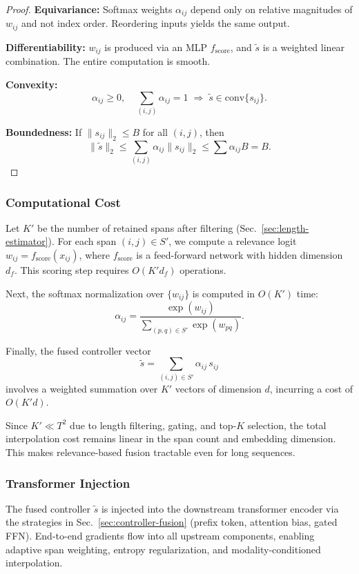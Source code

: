 \begin{proof}
	\textbf{Equivariance:} Softmax weights \(\alpha_{ij}\) depend only on relative magnitudes of \(w_{ij}\) and not index order. Reordering inputs yields the same output.
	
	\textbf{Differentiability:} \(w_{ij}\) is produced via an MLP \(f_{\mathrm{score}}\), and \(\tilde{s}\) is a weighted linear combination. The entire computation is smooth.
	
	\textbf{Convexity:}
	\[
	\alpha_{ij} \ge 0,\quad \sum_{(i,j)} \alpha_{ij} = 1
	\;\Rightarrow\;
	\tilde{s} \in \mathrm{conv}\{s_{ij}\}.
	\]
	
	\textbf{Boundedness:} If \(\|s_{ij}\|_2 \le B\) for all \((i,j)\), then
	\[
	\|\tilde{s}\|_2
	\le \sum_{(i,j)} \alpha_{ij} \|s_{ij}\|_2
	\le \sum \alpha_{ij} B = B.
	\]
\end{proof}

\subsubsection{Computational Cost}

Let \(K'\) be the number of retained spans after filtering (Sec.~\ref{sec:length-estimator}). For each span \((i,j)\in S'\), we compute a relevance logit \(w_{ij} = f_{\mathrm{score}}(x_{ij})\), where \(f_{\mathrm{score}}\) is a feed-forward network with hidden dimension \(d_f\). This scoring step requires \(O(K' d_f)\) operations.

Next, the softmax normalization over \(\{w_{ij}\}\) is computed in \(O(K')\) time:
\[
\alpha_{ij} = \frac{\exp(w_{ij})}{\sum_{(p,q)\in S'}\exp(w_{pq})}.
\]

Finally, the fused controller vector
\[
\tilde{s} = \sum_{(i,j)\in S'} \alpha_{ij}\,s_{ij}
\]
involves a weighted summation over \(K'\) vectors of dimension \(d\), incurring a cost of \(O(K'd)\).

Since \(K'\ll T^2\) due to length filtering, gating, and top-\(K\) selection, the total interpolation cost remains linear in the span count and embedding dimension. This makes relevance-based fusion tractable even for long sequences.

\subsubsection{Transformer Injection}

The fused controller \(\tilde{s}\) is injected into the downstream transformer encoder via the strategies in Sec.~\ref{sec:controller-fusion} (prefix token, attention bias, gated FFN). End-to-end gradients flow into all upstream components, enabling adaptive span weighting, entropy regularization, and modality‐conditioned interpolation.